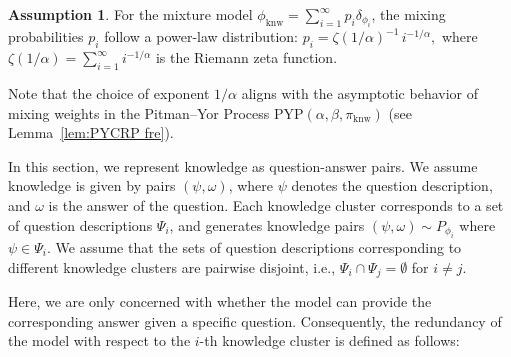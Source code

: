 \documentclass[11pt]{article}
\theoremstyle{plain}
\theoremstyle{definition}
\newtheorem{assumption}[theorem]{Assumption}
\newcommand{\knwModel}{\phi_{\text{knw}}}
\newcommand{\basemeasure}{\pi_{\text{knw}}}
\newcommand{\question}{\psi}
\newcommand{\questionset}{\Psi}
\newcommand{\answer}{\omega}
\newcommand{\jian}[1]{{\it \color{red}{Jian: #1}}}
\newcommand{\zhixuan}[1]{{\it \color{blue}{zhixuan: #1}}}
\begin{document}
\begin{assumption}
\label{appass:powerlaw}
For the mixture model \( \knwModel = \sum_{i=1}^{\infty} p_i \delta_{\phi_i} \), the mixing probabilities \( p_i \) 
follow a power-law distribution:
$
p_i = \zeta(1/\alpha)^{-1} \, i^{-1/\alpha},
$
where \( \zeta(1/\alpha) = \sum_{i=1}^{\infty} i^{-1/\alpha} \) is the Riemann zeta function.

Note that the choice of exponent \(1/\alpha\) aligns with the asymptotic behavior of mixing weights in the Pitman–Yor Process \( \mathrm{PYP}(\alpha, \beta, \basemeasure) \) (see Lemma~\ref{lem:PYCRP fre}). 

\end{assumption}



In this section, we represent knowledge as question-answer pairs. We assume knowledge is given by pairs \( (\question, \answer) \), where \( \question \) denotes the question description, and \( \answer \) is the answer of the question. 
Each knowledge cluster corresponds to a set of question descriptions \( \questionset_i \), and generates knowledge pairs \( (\question, \answer) \sim P_{\phi_i} \) where \( \question \in \questionset_i \).  
We assume that the sets of question descriptions corresponding to different knowledge clusters are pairwise disjoint, i.e., \( \questionset_i \cap \questionset_j = \emptyset \) for \( i \ne j \). 



Here, we are only concerned with whether the model can provide the corresponding answer given a specific question. Consequently, the redundancy of the model with respect to the \( i \)-th knowledge cluster is defined as follows:
\end{document}
